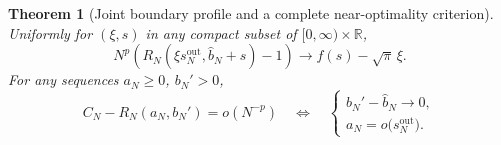 \documentclass[11pt]{article}
\numberwithin{equation}{section}
\newtheorem{theorem}{Theorem}[section]
\theoremstyle{definition}
\theoremstyle{remark}
\begin{document}
\begin{theorem}[Joint boundary profile and a complete near-optimality criterion]
\label{eul:thm:joint-profile}
Uniformly for $(\xi,s)$ in any compact subset of
$[0,\infty)\times\mathbb R$,
\begin{equation}\label{eul:eq:joint-profile}
 N^p\left(R_N(\xi s_N^{\mathrm{out}},\widehat b_N+s)-1\right)
       \longrightarrow f(s)-\sqrt\pi\,\xi.
\end{equation}
For any sequences $a_N\geq0$, $b_N'>0$,
\begin{equation}\label{eul:eq:near-iff}
 C_N-R_N(a_N,b_N')=o(N^{-p})
 \quad\Longleftrightarrow\quad
 \begin{cases}
 b_N'-\widehat b_N\longrightarrow0,\\
 a_N=o\bigl(s_N^{\mathrm{out}}\bigr).
 \end{cases}
\end{equation}
\end{theorem}
\end{document}
